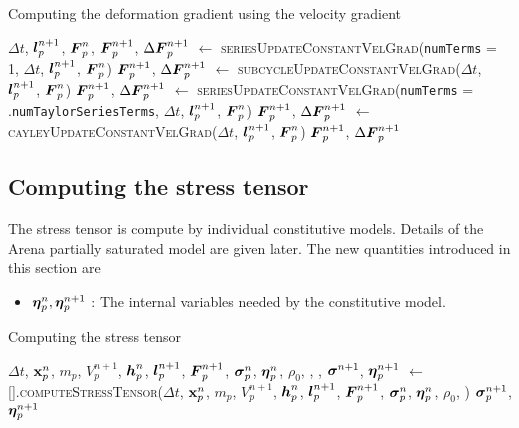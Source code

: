 \begin{breakablealgorithm}
  \caption{Computing the deformation gradient using the velocity gradient}
  \begin{algorithmic}[1]
    \Require $\Delta t$, $\boldsymbol{l}_p^{n+1}$, $\boldsymbol{F}_p^n$,
         \State $\boldsymbol{F}_p^{n+1}$, $\Delta\boldsymbol{F}_p^{n+1}$  $\leftarrow$ 
           \textsc{seriesUpdateConstantVelGrad}(\texttt{numTerms} = 1, $\Delta t$, $\boldsymbol{l}_p^{n+1}$, $\boldsymbol{F}_p^n$) 
         \State $\boldsymbol{F}_p^{n+1}$, $\Delta\boldsymbol{F}_p^{n+1}$  $\leftarrow$
           \textsc{subcycleUpdateConstantVelGrad}($\Delta t$, $\boldsymbol{l}_p^{n+1}$, $\boldsymbol{F}_p^n$) 
         \State $\boldsymbol{F}_p^{n+1}$, $\Delta\boldsymbol{F}_p^{n+1}$  $\leftarrow$
           \textsc{seriesUpdateConstantVelGrad}(\texttt{numTerms} = .\texttt{numTaylorSeriesTerms}, 
              $\Delta t$, $\boldsymbol{l}_p^{n+1}$, $\boldsymbol{F}_p^n$) 
      \Else
         \State $\boldsymbol{F}_p^{n+1}$, $\Delta\boldsymbol{F}_p^{n+1}$  $\leftarrow$
           \textsc{cayleyUpdateConstantVelGrad}($\Delta t$, $\boldsymbol{l}_p^{n+1}$, $\boldsymbol{F}_p^n$) 
      \EndIf
      \State \Return $\boldsymbol{F}_p^{n+1}$, $\Delta\boldsymbol{F}_p^{n+1}$ 
    \EndProcedure
  \end{algorithmic}
\end{breakablealgorithm}

\subsection{Computing the stress tensor}
The stress tensor is compute by individual constitutive models.  Details of the Arena partially
saturated model are given later. The new quantities introduced in this section are
\begin{itemize} 
  \setlength\itemsep{1pt}
  \item $\boldsymbol{\eta}_p^n, \boldsymbol{\eta}_p^{n+1}$ : {\Ochre The internal variables needed by the constitutive model.}
\end{itemize}
\begin{breakablealgorithm}
  \caption{Computing the stress tensor}
  \begin{algorithmic}[1]
    \Require $\Delta t$, $\mathbf{x}_p^n$, $m_p$, $V_p^{n+1}$, $\boldsymbol{h}_p^n$, $\boldsymbol{l}_p^{n+1}$, $\boldsymbol{F}_p^{n+1}$,
             $\boldsymbol{\sigma}_p^n$, $\boldsymbol{\eta}_p^n$, $\rho_0$, , , 
        \State $\boldsymbol{\sigma}^{n+1}$, $\boldsymbol{\eta}_p^{n+1}$ $\leftarrow$
          [\TTmatl].\textsc{computeStressTensor}($\Delta t$, $\mathbf{x}_p^n$, $m_p$, 
             $V_p^{n+1}$, $\boldsymbol{h}_p^n$, \WWRP 
             $\boldsymbol{l}_p^{n+1}$, $\boldsymbol{F}_p^{n+1}$, $\boldsymbol{\sigma}_p^n$, $\boldsymbol{\eta}_p^n$, $\rho_0$, )
      \EndFor
      \State \Return $\boldsymbol{\sigma}_p^{n+1}$, $\boldsymbol{\eta}_p^{n+1}$
    \EndProcedure
  \end{algorithmic}
\end{breakablealgorithm}

